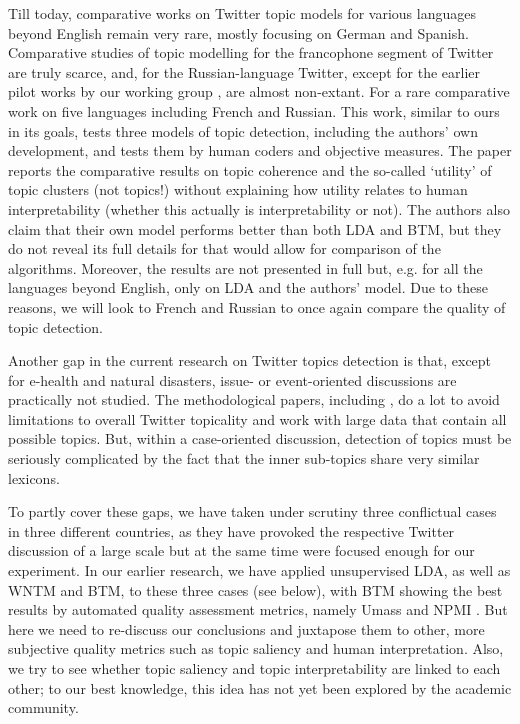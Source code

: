 Till today, comparative works on Twitter topic models for various languages beyond English remain very rare, mostly focusing on German and Spanish. Comparative studies of topic modelling for the francophone segment of Twitter are truly scarce, and, for the Russian-language Twitter, except for the earlier pilot works by our working group \cite{RamageDumaisLiebling,BlekanovTarasovMaksimov,SmoliarovaBodrunovaYakunin}, are almost non-extant. For a rare comparative work on five languages including French and Russian. This work, similar to ours in its goals, tests three models of topic detection, including the authors’ own development, and tests them by human coders and objective measures. The paper reports the comparative results on topic coherence and the so-called ‘utility’ of topic clusters (not topics!) without explaining how utility relates to human interpretability (whether this actually is interpretability or not). The authors also claim that their own model performs better than both LDA and BTM, but they do not reveal its full details for that would allow for comparison of the algorithms. Moreover, the results are not presented in full but, e.g. for all the languages beyond English, only on LDA and the authors’ model. Due to these reasons, we will look to French and Russian to once again compare the quality of topic detection.

Another gap in the current research on Twitter topics detection is that, except for e-health and natural disasters, issue- or event-oriented discussions are practically not studied. The methodological papers, including \cite{Sridhar}, do a lot to avoid limitations to overall Twitter topicality and work with large data that contain all possible topics. But, within a case-oriented discussion, detection of topics must be seriously complicated by the fact that the inner sub-topics share very similar lexicons.

To partly cover these gaps, we have taken under scrutiny three conflictual cases in three different countries, as they have provoked the respective Twitter discussion of a large scale but at the same time were focused enough for our experiment. In our earlier research, we have applied unsupervised LDA, as well as WNTM and BTM, to these three cases (see below), with BTM showing the best results by automated quality assessment metrics, namely Umass and NPMI \cite{BlekanovTarasovMaksimov}. But here we need to re-discuss our conclusions and juxtapose them to other, more subjective quality metrics such as topic saliency and human interpretation. Also, we try to see whether topic saliency and topic interpretability are linked to each other; to our best knowledge, this idea has not yet been explored by the academic community.

